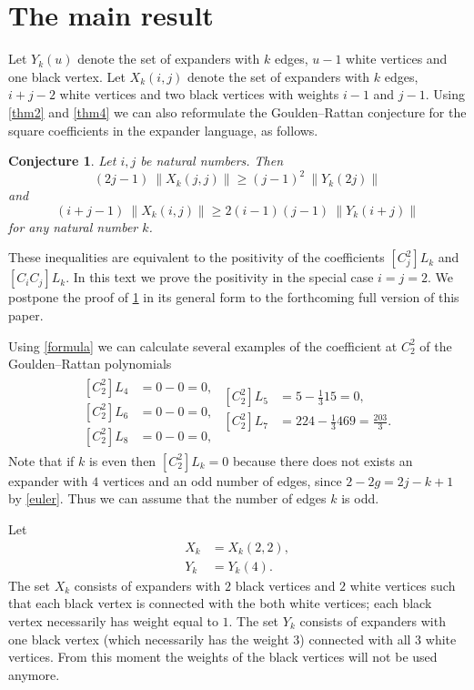 \documentclass[submission]{FPSAC2021}
\newtheorem{con}{Conjecture}
\begin{document}
\pagebreak[1] 

\section{The main result} 

Let $Y_k(u)$ denote the set of expanders with $k$
edges, $u-1$ white vertices and one black vertex. 
Let $X_k(i, j)$ denote the set of expanders with $k$ edges, $i+j-2$ white
vertices and two black vertices with weights $i-1$ and $j-1$. Using  \cref{thm2}
and \cref{thm4} we can also reformulate the Goulden--Rattan conjecture
for the square coefficients in the expander language, as follows.

\begin{con} 
    \label{con:GJ2}
Let $i, j$ be natural numbers. Then 
$$(2j-1)\ \left\| X_k(j, j) \right\| \geq (j-1)^2\ \left\| Y_k(2j) \right\|$$
and
$$(i+j-1)\ \left\| X_k(i, j) \right\| \geq 2(i-1)(j-1)\ \left\| Y_k(i+j) \right\|$$
for any natural number $k$. 
\end{con}
These inequalities are equivalent to the positivity 
of the coefficients $[C_j^2] L_k$ and $[C_i C_j] L_k$. 
In this text we prove the positivity in the special case $i=j=2$. 
We postpone the proof of \cref{con:GJ2} in its general form to the forthcoming full version of this paper.

Using \cref{formula} 
we can calculate several examples of the coefficient at $C_2^2$ of 
the Goulden--Rattan polynomials
\begin{align*}
\begin{split}
[C_2^2] L_4 &=0-0=0,\\
[C_2^2] L_6 &=0-0=0, \\
[C_2^2] L_8 &=0-0=0,
\end{split}
\begin{split}
[C_2^2] L_5 &=5-\frac{1}{3}15=0,\\
[C_2^2] L_7 &=224-\frac{1}{3}469=\frac{203}{3}.\\
\end{split}
\end{align*}
Note that if $k$ is even then $[C_2^2] L_k=0$ because there does not exists an expander with $4$ vertices and an odd number of edges, since
$2-2g=2j-k+1$ by \cref{euler}. Thus we can assume that the number of edges $k$ is odd. 

Let 
\begin{align}
\label{xdef}
X_k &= X_k(2, 2), \\
\label{ydef}
Y_k &= Y_k(4).
\end{align}
The set $X_k$ consists of expanders with $2$ black vertices and $2$ white vertices
such that each black vertex is connected with the both white vertices;
each black vertex necessarily has weight equal to $1$.
The set $Y_k$ consists of expanders with one black vertex (which necessarily has the weight $3$) connected
with all $3$ white vertices. From this moment the weights of the black vertices
will not be used anymore.
\end{document}
